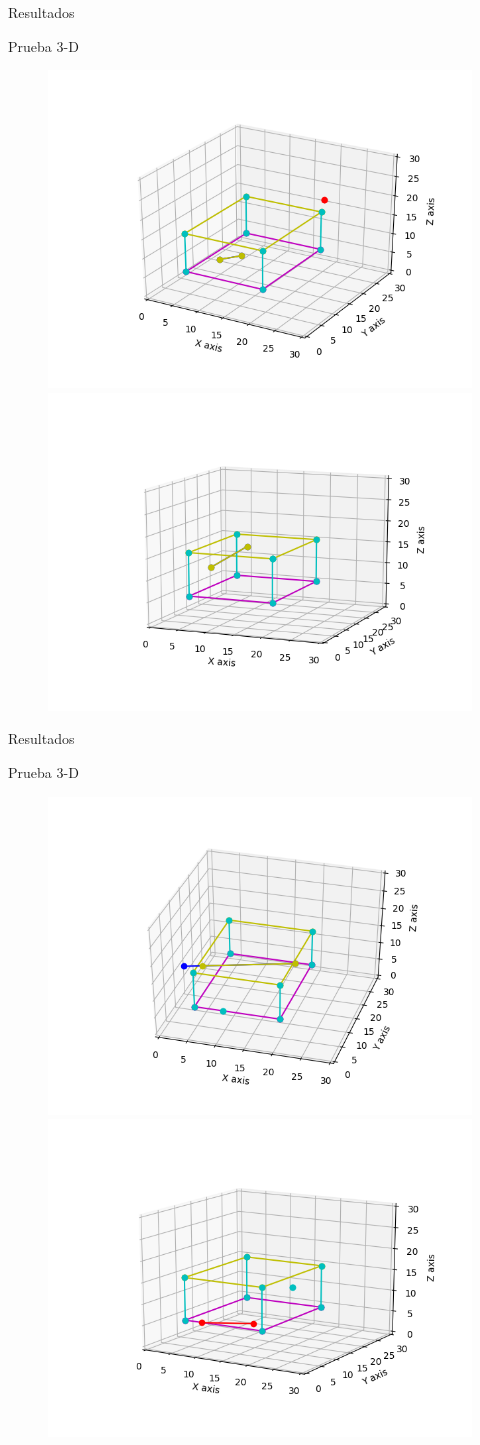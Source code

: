 \documentclass[11pt]{beamer}
\begin{document}
\begin{frame}{Resultados}
 \begin{block}{Prueba 3-D}
    \begin{figure}
        \includegraphics[width = 0.45\linewidth]{img/3Dprueba1}
        \includegraphics[width = 0.45\linewidth]{img/3Dprueba2}
    \end{figure}
 \end{block}
\end{frame}

\begin{frame}{Resultados}
 \begin{block}{Prueba 3-D}
    \begin{figure}
        \includegraphics[width = 0.45\linewidth]{img/3Dprueba3}
        \includegraphics[width = 0.45\linewidth]{img/3Dprueba5}
    \end{figure}
 \end{block}
\end{frame}
\end{document}

